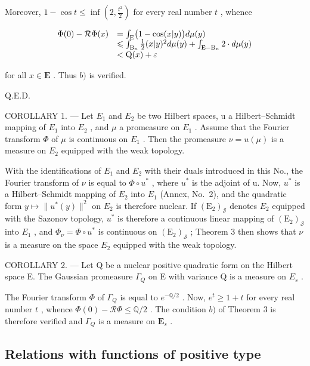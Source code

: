 Moreover, \(1 - \cos t \leqslant \inf \left(2, \frac{t^2}{2}\right)\) for every real number \(t\) , whence

\[
\begin{array}{r l} \Phi (0) - \mathcal {R} \Phi (x) & = \int_ {\mathrm{E}} \bigl (1 - \cos (x | y) \bigr) d \mu (y) \\ & \leqslant \int_ {\mathrm{B} _ {n}} \frac {1}{2} (x | y) ^ {2} d \mu (y) + \int_ {\mathrm{E} - \mathrm{B} _ {n}} 2 \cdot d \mu (y) \\ & <   \mathrm{Q} (x) + \varepsilon \end{array}
\]

for all \(x \in \mathbf{E}\) . Thus \(b)\) is verified.

Q.E.D.

COROLLARY 1. --- Let \(E_{1}\) and \(E_{2}\) be two Hilbert spaces, u a Hilbert--Schmidt mapping of \(E_{1}\) into \(E_{2}\) , and \(\mu\) a promeasure on \(E_{1}\) . Assume that the Fourier transform \(\Phi\) of \(\mu\) is continuous on \(E_{1}\) . Then the promeasure \(\nu = u(\mu)\) is a measure on \(E_{2}\) equipped with the weak topology.

With the identifications of \(E_{1}\) and \(E_{2}\) with their duals introduced in this No., the Fourier transform of \(\nu\) is equal to \(\Phi\circ u^{*}\) , where \(u^{*}\) is the adjoint of u. Now, \(u^{*}\) is a Hilbert--Schmidt mapping of \(E_{2}\) into \(E_{1}\) (Annex, No.~2), and the quadratic form \(y\mapsto\|u^{*}(y)\|^{2}\) on \(E_{2}\) is therefore nuclear. If \((\mathrm{E}_{2})_{\mathcal{S}}\) denotes \(E_{2}\) equipped with the Sazonov topology, \(u^{*}\) is therefore a continuous linear mapping of \((\mathrm{E}_{2})_{\mathcal{S}}\) into \(E_{1}\) , and \(\Phi_{\nu}=\Phi\circ u^{*}\) is continuous on \((\mathrm{E}_{2})_{\mathcal{S}}\) ; Theorem 3 then shows that \(\nu\) is a measure on the space \(E_{2}\) equipped with the weak topology.

COROLLARY 2. --- Let Q be a nuclear positive quadratic form on the Hilbert space E. The Gaussian promeasure \(\Gamma_{Q}\) on E with variance Q is a measure on \(E_{s}\) .

The Fourier transform \(\Phi\) of \(\Gamma_{Q}\) is equal to \(e^{-\mathbb{Q} / 2}\) . Now, \(e^t \geqslant 1 + t\) for every real number \(t\) , whence \(\Phi(0) - \mathcal{R}\Phi \leqslant \mathbb{Q} / 2\) . The condition \(b)\) of Theorem 3 is therefore verified and \(\Gamma_{Q}\) is a measure on \(\mathbf{E}_s\) .

\subsection{Relations with functions of positive type}

